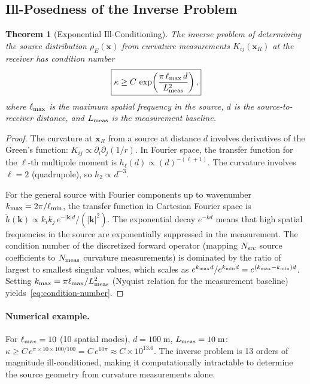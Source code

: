 \documentclass[twocolumn,superscriptaddress,prd,nofootinbib]{revtex4-2}
\newcommand{\xvec}{\mathbf{x}}
\newtheorem{theorem}{Theorem}
\begin{document}
\subsection{Ill-Posedness of the Inverse Problem}

\begin{theorem}[Exponential Ill-Conditioning]\label{thm:ill-posed}
The inverse problem of determining the source distribution $\rho_E(\xvec)$
from curvature measurements $K_{ij}(\xvec_R)$ at the receiver has
condition number
\begin{equation}
\boxed{
\kappa \geq C\,\exp\!\left(\frac{\pi\,\ell_{\rm max}\,d}{L_{\rm meas}^2}\right),
}
\label{eq:condition-number}
\end{equation}
where $\ell_{\rm max}$ is the maximum spatial frequency in the source,
$d$ is the source-to-receiver distance, and $L_{\rm meas}$ is the
measurement baseline.
\end{theorem}

\begin{proof}
The curvature at $\xvec_R$ from a source at distance $d$ involves
derivatives of the Green's function:
$K_{ij} \propto \partial_i\partial_j(1/r)$. In Fourier space, the
transfer function for the $\ell$-th multipole moment is
$h_\ell(d) \propto (d)^{-(\ell+1)}$. The curvature involves
$\ell = 2$ (quadrupole), so $h_2 \propto d^{-3}$.

For the general source with Fourier components up to wavenumber
$k_{\max} = 2\pi/\ell_{\rm min}$, the transfer function in Cartesian
Fourier space is
$\tilde{h}(\mathbf{k}) \propto k_i k_j\,e^{-|\mathbf{k}|d}/(|\mathbf{k}|^2)$.
The exponential decay $e^{-kd}$ means that high spatial frequencies in
the source are exponentially suppressed in the measurement. The condition
number of the discretized forward operator (mapping $N_{\rm src}$ source
coefficients to $N_{\rm meas}$ curvature measurements) is dominated by
the ratio of largest to smallest singular values, which scales as
$e^{k_{\rm max}d}/e^{k_{\rm min}d} = e^{(k_{\rm max}-k_{\rm min})d}$.
Setting $k_{\rm max} = \pi\ell_{\rm max}/L_{\rm meas}^2$ (Nyquist
relation for the measurement baseline) yields~\eqref{eq:condition-number}.
\end{proof}

\paragraph{Numerical example.}
For $\ell_{\rm max} = 10$ (10 spatial modes),
$d = 100\;\text{m}$, $L_{\rm meas} = 10\;\text{m}$:
$\kappa \geq C\,e^{\pi\times 10\times 100/100} = C\,e^{10\pi} \approx C\times 10^{13.6}$.
The inverse problem is 13 orders of magnitude ill-conditioned, making
it computationally intractable to determine the source geometry from
curvature measurements alone.
\end{document}
